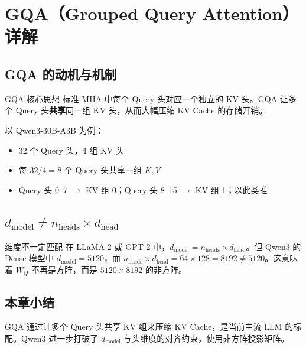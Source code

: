 \section{GQA（Grouped Query Attention）详解}

\subsection{GQA 的动机与机制}

\begin{importantbox}{GQA 核心思想}
标准 MHA 中每个 Query 头对应一个独立的 KV 头。GQA 让多个 Query 头\textbf{共享}同一组 KV 头，从而大幅压缩 KV Cache 的存储开销。
\end{importantbox}

以 Qwen3-30B-A3B 为例：
\begin{itemize}
  \item 32 个 Query 头，4 组 KV 头
  \item 每 $32 / 4 = 8$ 个 Query 头共享一组 $K, V$
  \item Query 头 0--7 $\to$ KV 组 0；Query 头 8--15 $\to$ KV 组 1；以此类推
\end{itemize}

\subsection{$d_{\text{model}} \neq n_{\text{heads}} \times d_{\text{head}}$}

\begin{warningbox}{维度不一定匹配}
在 LLaMA 2 或 GPT-2 中，$d_{\text{model}} = n_{\text{heads}} \times d_{\text{head}}$。但 Qwen3 的 Dense 模型中 $d_{\text{model}} = 5120$，而 $n_{\text{heads}} \times d_{\text{head}} = 64 \times 128 = 8192 \neq 5120$。这意味着 $W_Q$ 不再是方阵，而是 $5120 \times 8192$ 的非方阵。
\end{warningbox}

\subsection{本章小结}

GQA 通过让多个 Query 头共享 KV 组来压缩 KV Cache，是当前主流 LLM 的标配。Qwen3 进一步打破了 $d_{\text{model}}$ 与头维度的对齐约束，使用非方阵投影矩阵。

